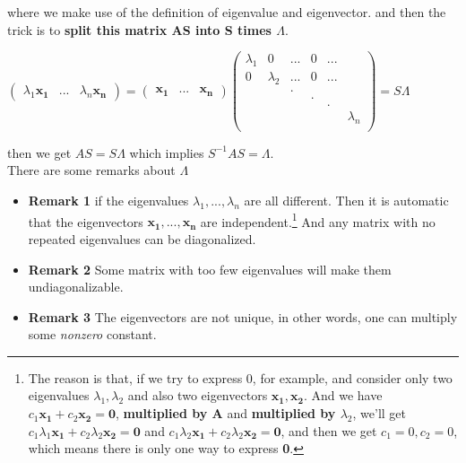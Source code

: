 \documentclass[12pt]{article}
\begin{document}
where we make use of the definition of eigenvalue and eigenvector.
and then the trick is to \textbf{split this matrix AS into S times $\Lambda$}.

\begin{center}
    $\begin{pmatrix}
        \lambda_1\mathbf{x_1} & ... & \lambda_n\mathbf{x_n}
    \end{pmatrix} = \begin{pmatrix}
        \mathbf{x_1} & ... & \mathbf{x_n}
    \end{pmatrix} \begin{pmatrix}
        \lambda_1 & 0 & ... & 0 & ...\\
        0 & \lambda_2 & ... & 0 & ...\\
        \ &\ & . \\
        \ &\ & \ & .\\
        \ &\ & \ & \ &.\\
        \ &\ & \ & \ & \ & \lambda_n\\
    \end{pmatrix} = S\Lambda$
\end{center}

then we get $AS = S\Lambda$ which implies $S^{-1}AS = \Lambda$.
\\
There are some remarks about $\Lambda$

\begin{itemize}
    \item \textbf{Remark 1} if the eigenvalues $\lambda_1, ..., \lambda_n$ are all different. Then it is automatic that the eigenvectors $\mathbf{x_1, ..., x_n}$ are independent.\footnote{The reason is that, if we try to express 0, for example, and consider only two eigenvalues $\lambda_1, \lambda_2$ and also two eigenvectors $\mathbf{x_1, x_2}$. And we have $c_1\mathbf{x_1}+c_2\mathbf{x_2} = \mathbf{0}$, \textbf{multiplied by A} and \textbf{multiplied by $\lambda_2$}, we'll get $c_1\lambda_1\mathbf{x_1} + c_2\lambda_2\mathbf{x_2} = \mathbf{0}$ and $c_1\lambda_2\mathbf{x_1} + c_2\lambda_2\mathbf{x_2} = \mathbf{0}$, and then we get $c_1 = 0, c_2 = 0$, which means there is only one way to express \textbf{0}.} And any matrix with no repeated eigenvalues can be diagonalized.
    \item \textbf{Remark 2} Some matrix with too few eigenvalues will make them undiagonalizable.
    \item \textbf{Remark 3} The eigenvectors are not unique, in other words, one can multiply some \textit{nonzero} constant.
\end{itemize}
\end{document}
